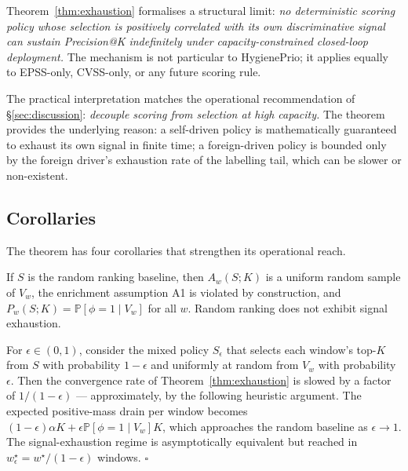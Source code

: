 Theorem~\ref{thm:exhaustion} formalises a structural limit: \emph{no
deterministic scoring policy whose selection is positively correlated
with its own discriminative signal can sustain Precision@K indefinitely
under capacity-constrained closed-loop deployment.} The mechanism is not
particular to HygienePrio; it applies equally to EPSS-only, CVSS-only,
or any future scoring rule.

The practical interpretation matches the operational recommendation of
\S\ref{sec:discussion}: \emph{decouple scoring from selection at high
capacity.} The theorem provides the underlying reason: a self-driven
policy is mathematically guaranteed to exhaust its own signal in finite
time; a foreign-driven policy is bounded only by the foreign driver's
exhaustion rate of the labelling tail, which can be slower or non-existent.

\subsection{Corollaries}

The theorem has four corollaries that strengthen its operational reach.

\begin{corollary}
\label{cor:random}
If $S$ is the random ranking baseline, then $A_w(S; K)$ is a uniform
random sample of $V_w$, the enrichment assumption A1 is violated by
construction, and $P_w(S; K) = \mathbb{P}[\phi = 1 \mid V_w]$ for all $w$.
Random ranking does not exhibit signal exhaustion.
\end{corollary}

\begin{corollary}
\label{cor:egreedy}
For $\epsilon \in (0, 1)$, consider the mixed policy $S_\epsilon$ that
selects each window's top-$K$ from $S$ with probability $1-\epsilon$
and uniformly at random from $V_w$ with probability $\epsilon$. Then
the convergence rate of Theorem~\ref{thm:exhaustion} is slowed by a
factor of $1/(1-\epsilon)$ --- approximately, by the following
heuristic argument. The expected
positive-mass drain per window becomes $(1-\epsilon) \alpha K
+ \epsilon \mathbb{P}[\phi=1 \mid V_w] K$, which approaches the random
baseline as $\epsilon \to 1$. The signal-exhaustion regime is
asymptotically equivalent but reached in $w^\star_\epsilon =
w^\star / (1-\epsilon)$ windows. \hfill$\square$
\end{corollary}

